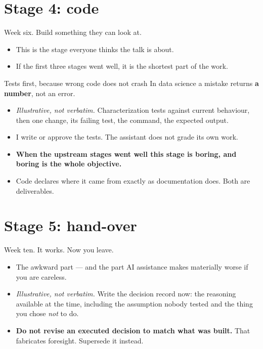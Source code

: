 \documentclass[aspectratio=169,t]{beamer}
\begin{document}
\section{Stage 4: code}

\begin{frame}{Week six. Build something they can look at.}
    \begin{itemize}
        \item This is the stage everyone thinks the talk is about.
        \item If the first three stages went well, it is the shortest part of the work.
    \end{itemize}
\end{frame}

\begin{frame}{Tests first, because wrong code does not crash}
    In data science a mistake returns \textbf{a number}, not an error.
    \begin{itemize}
        \item \emph{Illustrative, not verbatim.} Characterization tests against
              current behaviour, then one change, its failing test, the command,
              the expected output.
        \item I write or approve the tests. The assistant does not grade its own work.
        \item \textbf{When the upstream stages went well this stage is boring, and
              boring is the whole objective.}
        \item Code declares where it came from exactly as documentation does.
              Both are deliverables.
    \end{itemize}
\end{frame}

\section{Stage 5: hand-over}

\begin{frame}{Week ten. It works. Now you leave.}
    \begin{itemize}
        \item The awkward part --- and the part AI assistance makes materially
              worse if you are careless.
        \item \emph{Illustrative, not verbatim.} Write the decision record now:
              the reasoning available at the time, including the assumption nobody
              tested and the thing you chose \emph{not} to do.
        \item \textbf{Do not revise an executed decision to match what was built.}
              That fabricates foresight. Supersede it instead.
    \end{itemize}
\end{frame}
\end{document}
